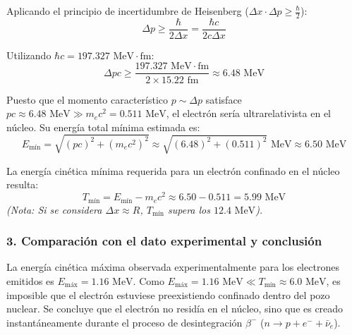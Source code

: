 \begin{problema}
Aplicando el principio de incertidumbre de Heisenberg ($\Delta x \cdot \Delta p \ge \frac{\hbar}{2}$):
\begin{equation*}
\Delta p \ge \frac{\hbar}{2 \Delta x} = \frac{\hbar c}{2 c \Delta x}
\end{equation*}

Utilizando $\hbar c = 197.327\text{ MeV}\cdot\text{fm}$:
\begin{equation*}
\Delta p c \ge \frac{197.327\text{ MeV}\cdot\text{fm}}{2 \times 15.22\text{ fm}} \approx 6.48\text{ MeV}
\end{equation*}

Puesto que el momento característico $p \sim \Delta p$ satisface $p c \approx 6.48\text{ MeV} \gg m_e c^2 = 0.511\text{ MeV}$, el electrón sería ultrarelativista en el núcleo. Su energía total mínima estimada es:
\begin{equation*}
E_{\text{mín}} = \sqrt{(p c)^2 + (m_e c^2)^2} \approx \sqrt{(6.48)^2 + (0.511)^2}\text{ MeV} \approx 6.50\text{ MeV}
\end{equation*}

La energía cinética mínima requerida para un electrón confinado en el núcleo resulta:
\begin{equation*}
T_{\text{mín}} = E_{\text{mín}} - m_e c^2 \approx 6.50 - 0.511 = 5.99\text{ MeV}
\end{equation*}
\textit{(Nota: Si se considera $\Delta x \approx R$, $T_{\text{mín}}$ supera los $12.4\text{ MeV}$).}

\subsubsection*{3. Comparación con el dato experimental y conclusión}

La energía cinética máxima observada experimentalmente para los electrones emitidos es $E_{\text{máx}} = 1.16\text{ MeV}$. Como $E_{\text{máx}} = 1.16\text{ MeV} \ll T_{\text{mín}} \approx 6.0\text{ MeV}$, es imposible que el electrón estuviese preexistiendo confinado dentro del pozo nuclear. Se concluye que el electrón no residía en el núcleo, sino que es creado instantáneamente durante el proceso de desintegración $\beta^-$ ($n \to p + e^- + \bar{\nu}_e$).
\end{problema}

